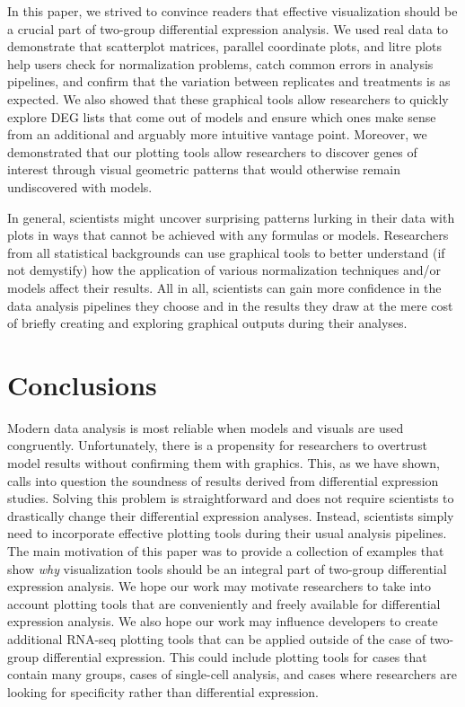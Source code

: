 \documentclass{bmcart}
\begin{document}
\begin{linenumbers}
\begin{doublespacing}
In this paper, we strived to convince readers that effective visualization should be a crucial part of two-group differential expression analysis. We used real data to demonstrate that scatterplot matrices, parallel coordinate plots, and litre plots help users check for normalization problems, catch common errors in analysis pipelines, and confirm that the variation between replicates and treatments is as expected. We also showed that these graphical tools allow researchers to quickly explore DEG lists that come out of models and ensure which ones make sense from an additional and arguably more intuitive vantage point. Moreover, we demonstrated that our plotting tools allow researchers to discover genes of interest through visual geometric patterns that would otherwise remain undiscovered with models.

In general, scientists might uncover surprising patterns lurking in their data with plots in ways that cannot be achieved with any formulas or models. Researchers from all statistical backgrounds can use graphical tools to better understand (if not demystify) how the application of various normalization techniques and/or models affect their results. All in all, scientists can gain more confidence in the data analysis pipelines they choose and in the results they draw at the mere cost of briefly creating and exploring graphical outputs during their analyses.

\section*{Conclusions}

Modern data analysis is most reliable when models and visuals are used congruently. Unfortunately, there is a propensity for researchers to overtrust model results without confirming them with graphics. This, as we have shown, calls into question the soundness of results derived from differential expression studies. Solving this problem is straightforward and does not require scientists to drastically change their differential expression analyses. Instead, scientists simply need to incorporate effective plotting tools during their usual analysis pipelines. The main motivation of this paper was to provide a collection of examples that show \textit{why} visualization tools should be an integral part of two-group differential expression analysis. We hope our work may motivate researchers to take into account plotting tools that are conveniently and freely available for differential expression analysis. We also hope our work may influence developers to create additional RNA-seq plotting tools that can be applied outside of the case of two-group differential expression. This could include plotting tools for cases that contain many groups, cases of single-cell analysis, and cases where researchers are looking for specificity rather than differential expression. 


\end{doublespacing}
\end{linenumbers}
\end{document}
